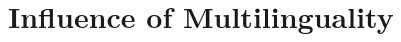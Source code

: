 \documentclass{article}
\begin{document}




\FloatBarrier
\newpage
\section{Influence of Multilinguality} \label{app: Influence_M}
\end{document}
